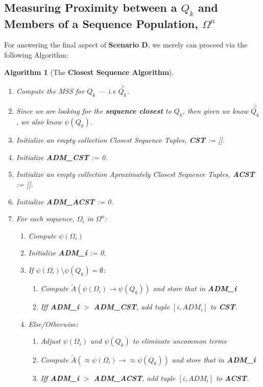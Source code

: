 \documentclass[a4paper, 18pt]{book} %
\newtheorem{alg}{Algorithm}
\begin{document}
\subsection{Measuring Proximity between a $Q_k$ and Members of a Sequence Population, $\Omega^n$}
\label{SECSEQPROXSEQ}

For answering the final aspect of \textbf{Scenario D}, we merely can proceed via the following Algorithm:

\begin{alg}[The \textbf{Closest Sequence Algorithm}]
\label{ALGCSA}
\begin{enumerate}
\item Compute the MSS for $Q_k$ --- i.e $\overset{>}{Q_k}$.
\item Since we are looking for the \textbf{sequence closest} to $Q_k$, then given we know $\overset{>}{Q_k}$, we also know $\psi(Q_k)$.
\item Initialize an empty collection Closest Sequence Tuples, \textbf{CST} := [].
\item Initialize \textbf{ADM\_CST} := 0.
\item Initialize  an empty collection  Aproximately Closest Sequence Tuples, \textbf{ACST} := [].
\item Initialize \textbf{ADM\_ACST} := 0.
\item {For each sequence, $\Omega_i$ in $\Omega^n$: 
	\begin{enumerate}
	\item Compute $\psi(\Omega_i)$
	\item Initialize \textbf{ADM\_i} := 0.
	\item{If $\psi(\Omega_i) \setminus \psi(Q_k) = \emptyset$: 
		\begin{enumerate}
			\item Compute $\tilde{A}(\psi(\Omega_i) \rightarrow \psi(Q_k))$ and store that in \textbf{ADM\_i}
			\item Iff \textbf{ADM\_i} $>$ \textbf{ADM\_CST}, add tuple $[i, ADM_i]$ to \textbf{CST}.
		\end{enumerate}			
	}
	\item Else/Otherwise:{
	 \begin{enumerate}
	 		\item Adjust $\psi(\Omega_i)$ and $\psi(Q_k)$ to eliminate uncommon terms
			\item Compute $\tilde{A}(\approx \psi(\Omega_i) \rightarrow \approx \psi(Q_k))$ and store that in \textbf{ADM\_i}
			\item Iff \textbf{ADM\_i} $>$ \textbf{ADM\_ACST}, add tuple $[i, ADM_i]$ to \textbf{ACST}.

\end{enumerate}}
\end{enumerate}}
\end{enumerate}
\end{alg}
\end{document}
